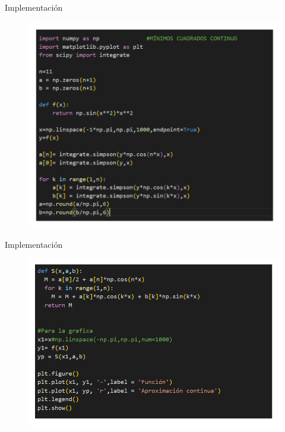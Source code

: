 \begin{frame}{Implementación}
    \begin{figure}
        \centering
        \includegraphics[width=.5\paperwidth]{p13-code1.png}
        \label{fig:enter-label}
    \end{figure}
\end{frame}
\begin{frame}{Implementación}
    \begin{figure}
        \centering
        \includegraphics[width=.5\paperwidth]{p13-code2.png}
        \label{fig:enter-label}
    \end{figure}
\end{frame}
